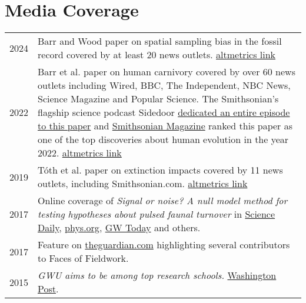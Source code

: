 \documentclass{article}
\begin{document}
\section*{Media Coverage}
\begin{longtable}{p{}p{}}
2024 & Barr and Wood paper on spatial sampling bias in the fossil record covered by at least 20 news outlets. \href{https://www.altmetric.com/details/166500154/news}{altmetrics link}\\[4pt]
2022 & Barr et al. paper on human carnivory covered by over 60 news outlets including Wired, BBC, The Independent, NBC News, Science Magazine and Popular Science. The Smithsonian's flagship science podcast Sidedoor \href{https://www.si.edu/sidedoor/did-meat-make-us-human}{dedicated an entire episode to this paper} and \href{https://www.smithsonianmag.com/smithsonian-institution/fourteen-discoveries-made-about-human-evolution-in-2022-180981344/}{Smithsonian Magazine} ranked this paper as one of the top discoveries about human evolution in the year 2022. \href{https://www.altmetric.com/details/121513529/news}{altmetrics link}\\[4pt]
2019 & Tóth et al. paper on extinction impacts covered by 11 news outlets, including Smithsonian.com. \href{https://www.altmetric.com/details/66845562/news}{altmetrics link}\\[4pt]
2017 &  Online coverage of \emph{Signal or noise? A null model method for testing hypotheses about pulsed faunal turnover} in \href{https://www.sciencedaily.com/releases/2017/08/170804100410.htm}{Science Daily}, \href{https://phys.org/news/2017-08-paper-genus-homo-response-environmental.html}{phys.org}, \href{https://gwtoday.gwu.edu/origin-human-genus-may-have-occurred-chance}{GW Today} and others. \\[4pt]
2017 & Feature on \href{https://www.theguardian.com/lifeandstyle/2017/jul/01/pregnant-in-the-field-blog-photography-have-trowel-will-travel}{theguardian.com} highlighting several contributors to Faces of Fieldwork.\\[4pt]
2015 & \emph{GWU aims to be among top research schools.} \href{http://www.washingtonpost.com/local/education/gwu-aims-to-be-among-top-research-schools/2015/03/03/491da24e-c1f1-11e4-9ec2-b418f57a4a99_gallery.html}{Washington Post}.\\
\end{longtable}
\end{document}
